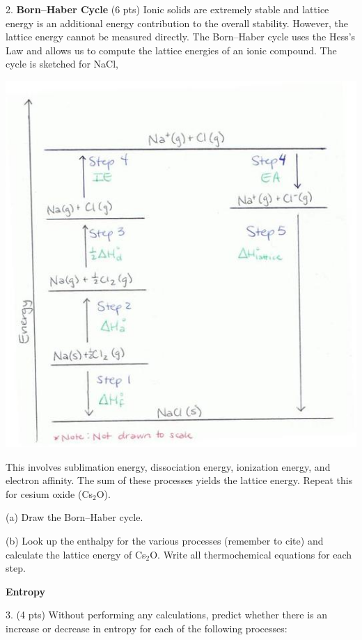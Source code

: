 \documentclass[11pt]{article}
\begin{document}
2. \textbf{Born--Haber Cycle} (6 pts) Ionic solids are extremely stable and lattice energy
is an additional energy contribution to the overall stability. However, the lattice
energy cannot be measured directly. The Born--Haber cycle uses the Hess's Law and allows us
to compute the lattice energies of an ionic compound. The cycle is sketched for NaCl,
\begin{center}
  \includegraphics[scale=0.5]{born_haber_nacl.jpg}
\end{center}

This involves sublimation energy, dissociation energy, ionization energy,
and electron affinity. The sum of these processes yields the lattice energy. Repeat
this for cesium oxide (Cs$_2$O).

(a) Draw the Born--Haber cycle.

(b) Look up the enthalpy for the various processes (remember to cite) and calculate
the lattice energy of Cs$_2$O. Write all thermochemical equations for each step.

\pagebreak


\textbf{Entropy}


3. (4 pts) Without performing any calculations, predict whether there is an increase or
decrease in entropy for each of the following processes:
\end{document}
